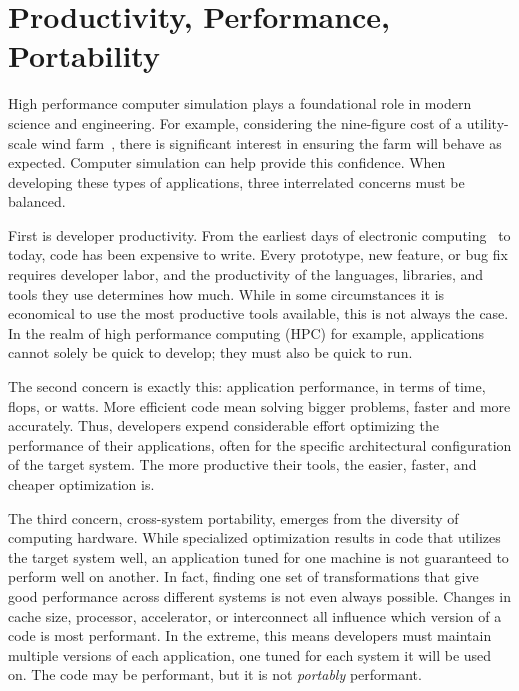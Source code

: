 \chapter{Productivity, Performance, Portability}

High performance computer simulation plays a foundational role in modern science and engineering.
For example, considering the nine-figure cost of a utility-scale wind farm~\cite{wiser2022land}, there is significant interest in ensuring the farm will behave as expected. 
Computer simulation can help provide this confidence.
When developing these types of applications, three interrelated concerns must be balanced. 

First is developer productivity.
From the earliest days of electronic computing~\cite{backus1957fortran} to today, code has been expensive to write.
Every prototype, new feature, or bug fix requires developer labor, and the productivity of the languages, libraries, and tools they use determines how much.
While in some circumstances it is economical to use the most productive tools available, this is not always the case.
In the realm of high performance computing (HPC) for example, applications cannot solely be quick to develop; they must also be quick to run.

The second concern is exactly this: application performance, in terms of time, flops, or watts.
More efficient code mean solving bigger problems, faster and more accurately.
Thus, developers expend considerable effort optimizing the performance of their applications, often for the specific architectural configuration of the target system.
The more productive their tools, the easier, faster, and cheaper optimization is.

The third concern, cross-system portability, emerges from the diversity of computing hardware. 
While specialized optimization results in code that utilizes the target system well, an application tuned for one machine is not guaranteed to perform well on another.
In fact, finding one set of transformations that give good performance across different systems is not even always possible.
Changes in cache size, processor, accelerator, or interconnect all influence which version of a code is most performant.
In the extreme, this means developers must maintain multiple versions of each application, one tuned for each system it will be used on.
The code may be performant, but it is not \textit{portably} performant.

